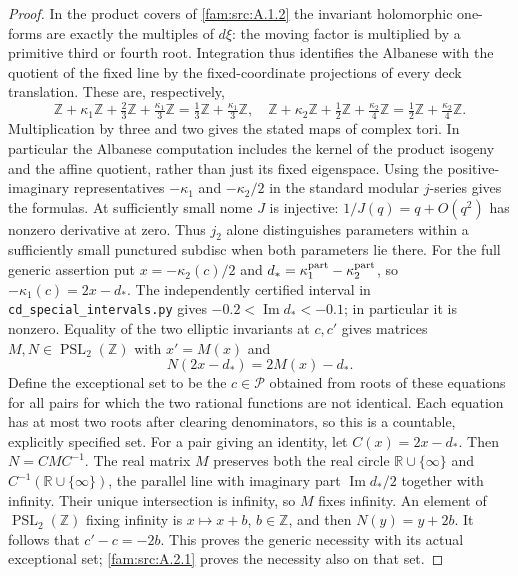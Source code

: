 \begin{proof}
In the product covers of \ref{fam:src:A.1.2} the invariant holomorphic one-forms are exactly the multiples of $d\xi$: the moving factor is multiplied by a primitive third or fourth root. Integration thus identifies the Albanese with the quotient of the fixed line by the fixed-coordinate projections of every deck translation. These are, respectively,
\[
 \mathbb Z+\kappa_1\mathbb Z+\tfrac23\mathbb Z+\tfrac{\kappa_1}3\mathbb Z
   =\tfrac13\mathbb Z+\tfrac{\kappa_1}3\mathbb Z,
\quad
 \mathbb Z+\kappa_2\mathbb Z+\tfrac12\mathbb Z+\tfrac{\kappa_2}4\mathbb Z
   =\tfrac12\mathbb Z+\tfrac{\kappa_2}4\mathbb Z.
\]
Multiplication by three and two gives the stated maps of complex tori. In particular the Albanese computation includes the kernel of the product isogeny and the affine quotient, rather than just its fixed eigenspace. Using the positive-imaginary representatives $-\kappa_1$ and $-\kappa_2/2$ in the standard modular $j$-series gives the formulas. At sufficiently small nome $J$ is injective: $1/J(q)=q+O(q^2)$ has nonzero derivative at zero. Thus $j_2$ alone distinguishes parameters within a sufficiently small punctured subdisc when both parameters lie there. For the full generic assertion put $x=-\kappa_2(c)/2$ and $d_*=\kappa_1^{\rm part}-\kappa_2^{\rm part}$, so $-\kappa_1(c)=2x-d_*$. The independently certified interval in \texttt{cd\_special\_intervals.py} gives $-0.2<\operatorname{Im}d_*<-0.1$; in particular it is nonzero. Equality of the two elliptic invariants at $c,c'$ gives matrices $M,N\in\operatorname{PSL}_2(\mathbb Z)$ with $x'=M(x)$ and
\[
 N(2x-d_*)=2M(x)-d_*.
\]
Define the exceptional set to be the $c\in\mathcal P$ obtained from roots of these equations for all pairs for which the two rational functions are not identical. Each equation has at most two roots after clearing denominators, so this is a countable, explicitly specified set. For a pair giving an identity, let $C(x)=2x-d_*$. Then $N=CMC^{-1}$. The real matrix $M$ preserves both the real circle $\mathbb R\cup\{\infty\}$ and $C^{-1}(\mathbb R\cup\{\infty\})$, the parallel line with imaginary part $\operatorname{Im}d_*/2$ together with infinity. Their unique intersection is infinity, so $M$ fixes infinity. An element of $\operatorname{PSL}_2(\mathbb Z)$ fixing infinity is $x\mapsto x+b$, $b\in\mathbb Z$, and then $N(y)=y+2b$. It follows that $c'-c=-2b$. This proves the generic necessity with its actual exceptional set; \ref{fam:src:A.2.1} proves the necessity also on that set.
\end{proof}

